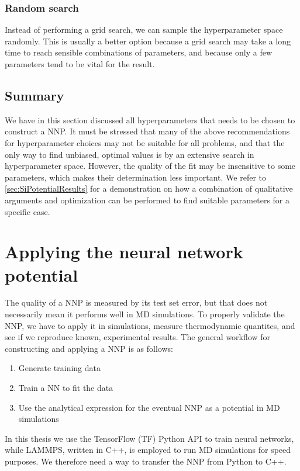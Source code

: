 \documentclass[twoside,english]{uiofysmaster}
\begin{document}
\subsubsection{Random search}
Instead of performing a grid search, we can sample the hyperparameter space randomly. This is usually a better option because 
a grid search may take a long time to reach sensible combinations of parameters, and because only a few parameters
tend to be vital for the result. 

\subsection{Summary}
We have in this section discussed all hyperparameters that needs to be chosen to construct a NNP. 
It must be stressed that many of the above recommendations for hyperparameter choices may not be suitable 
for all problems, and that the only way to find unbiased, optimal values is by an extensive search 
in hyperparameter space. However, the quality of the fit may be insensitive to some parameters, which makes their 
determination less important. 
We refer to \autoref{sec:SiPotentialResults} for a demonstration on how 
a combination of qualitative arguments and optimization can be performed to find suitable parameters 
for a specific case. 



\section{Applying the neural network potential} \label{sec:applyingNNP}
The quality of a NNP is measured by its test set error, but that does not necessarily mean it performs 
well in MD simulations. To properly validate the NNP, we have to apply it in simulations, measure thermodynamic quantites, 
and see if we reproduce known, experimental results. 
The general workflow for constructing and applying a NNP is as follows: 
\begin{enumerate}
 \item Generate training data
 \item Train a NN to fit the data
 \item Use the analytical expression for the eventual NNP as a potential in MD simulations
\end{enumerate}
In this thesis we use the TensorFlow (TF) Python API to train neural networks, while LAMMPS, written in C++, is
employed to run MD simulations for speed purposes. 
We therefore need a way to transfer the NNP from Python to C++. 
\end{document}
